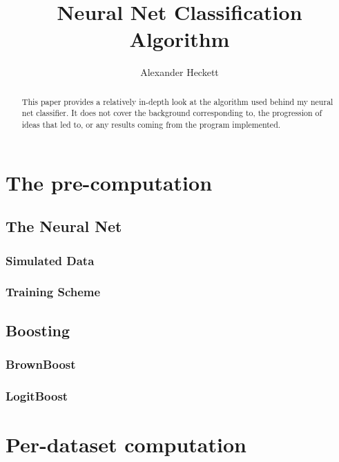 \documentclass[twocolumn]{article}
\begin{document}
\title{Neural Net Classification Algorithm}
\author{Alexander Heckett}
\maketitle
\begin{abstract}
\indent \indent This paper provides a relatively in-depth look at the algorithm used behind my neural net classifier. It does not cover the background corresponding to, the progression of ideas that led to, or any results coming from the program implemented. 
\end{abstract}
\tableofcontents
\section{The pre-computation}
\subsection{The Neural Net}
\subsubsection{Simulated Data}
\subsubsection{Training Scheme}
\subsection{Boosting}
\subsubsection{BrownBoost}
\subsubsection{LogitBoost}
\section{Per-dataset computation}
\end{document}
